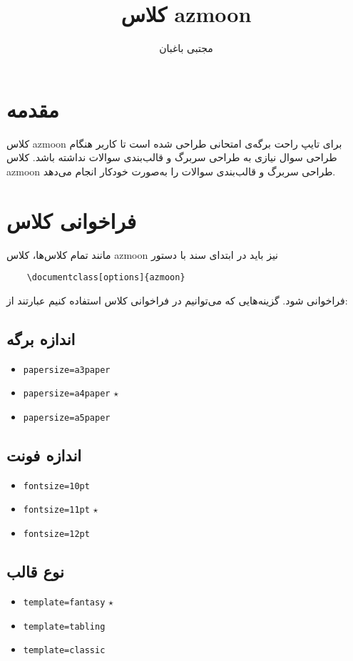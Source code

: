\documentclass[a3paper,12pt,nohead]{azmoon}
\title{کلاس azmoon}
\author{مجتبی باغبان}
\begin{document}
	\maketitle
	\tableofcontents
	\section{مقدمه}
		کلاس azmoon برای تایپ راحت برگه‌ی امتحانی طراحی شده است تا کاربر هنگام طراحی سوال نیازی به طراحی سربرگ و قالب‌بندی سوالات نداشته باشد. کلاس azmoon طراحی سربرگ و قالب‌بندی سوالات را به‌صورت خودکار انجام می‌دهد.
	\section{فراخوانی کلاس}
	مانند تمام کلاس‌ها، کلاس azmoon نیز باید در ابتدای سند با دستور
	\begin{LTR}
	\begin{verbatim}
	\documentclass[options]{azmoon}
	\end{verbatim}
	\end{LTR}
	فراخوانی شود. گزینه‌هایی که می‌توانیم در فراخوانی کلاس استفاده کنیم عبارتند از:
	\subsection{اندازه برگه}
	\begin{latin}
	\begin{itemize}
		\item \verb|papersize=a3paper|
		\item \verb|papersize=a4paper| $\star$
		\item \verb|papersize=a5paper|
	\end{itemize}
	\end{latin}
	\subsection{اندازه فونت}
	\begin{latin}
		\begin{itemize}
			\item \verb|fontsize=10pt|
			\item \verb|fontsize=11pt| $\star$
			\item \verb|fontsize=12pt|
		\end{itemize}
	\end{latin}
	\subsection{نوع قالب}
	\begin{latin}
		\begin{itemize}
			\item \verb|template=fantasy| $\star$
			\item \verb|template=tabling|
			\item \verb|template=classic|
		\end{itemize}
	\end{latin}
\end{document}
